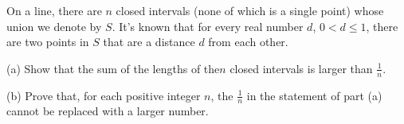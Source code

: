 On a line, there are $n$ closed intervals (none of which is a single point) whose union we denote by $S$. It's known that for every real number $d$,  $0<d\le 1$,  there are two points in $S$ that are a distance $d$ from each other.



(a) Show that the sum of the lengths of the$n$ closed intervals is larger than $\frac{1}{n}$.

(b) Prove that, for each positive integer $n$,  the $\frac{1}{n}$ in the statement of part (a) cannot be replaced with a larger number.
